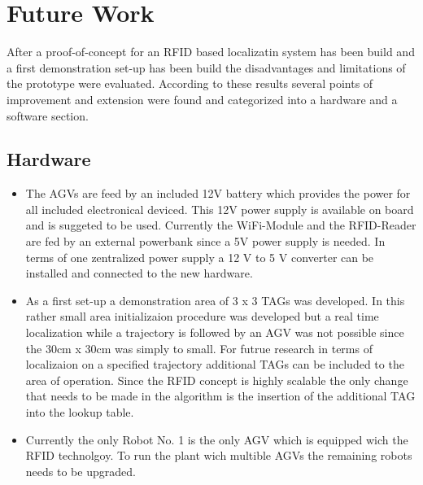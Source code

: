 \section{Future Work}
After a proof-of-concept for an RFID based localizatin system has been build and a first demonstration set-up has been build the disadvantages and limitations of the prototype were evaluated. According to these results several points of improvement and extension were found and categorized into a hardware and a software section. 
\subsection{Hardware}
\begin{itemize}
\item The AGVs are feed by an included 12V battery which provides the power for all included electronical deviced. This 12V power supply is available on board and is suggeted to be used. Currently the WiFi-Module and the RFID-Reader are fed by an external powerbank since a 5V power supply is needed. In terms of one zentralized power supply a 12 V to 5 V converter can be installed and connected to the new hardware.
\item As a first set-up a demonstration area of 3 x 3 TAGs was developed. In this rather small area initializaion procedure was developed but a real time localization while a trajectory is followed by an AGV was not possible since the 30cm x 30cm was simply to small. For futrue research in terms of localizaion on a specified trajectory additional TAGs can be included to the area of operation. Since the RFID concept is highly scalable the only change that needs to be made in the algorithm is the insertion of the additional TAG into the lookup table.
\item Currently the only Robot No. 1 is the only AGV which is equipped wich the RFID technolgoy. To run the plant wich multible AGVs the remaining robots needs to be upgraded.\\
\end{itemize}
